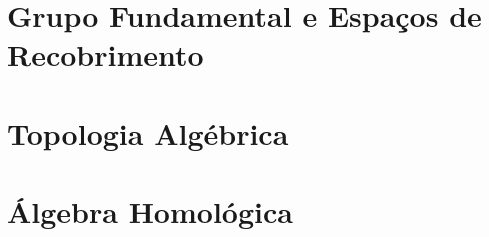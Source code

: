 \documentclass{book}
\begin{document}



\tableofcontents

\setcounter{page}{0}

\chapter{Grupo Fundamental e Espaços de Recobrimento}

\chapter{Topologia Algébrica}

\chapter{Álgebra Homológica}


\end{document}
